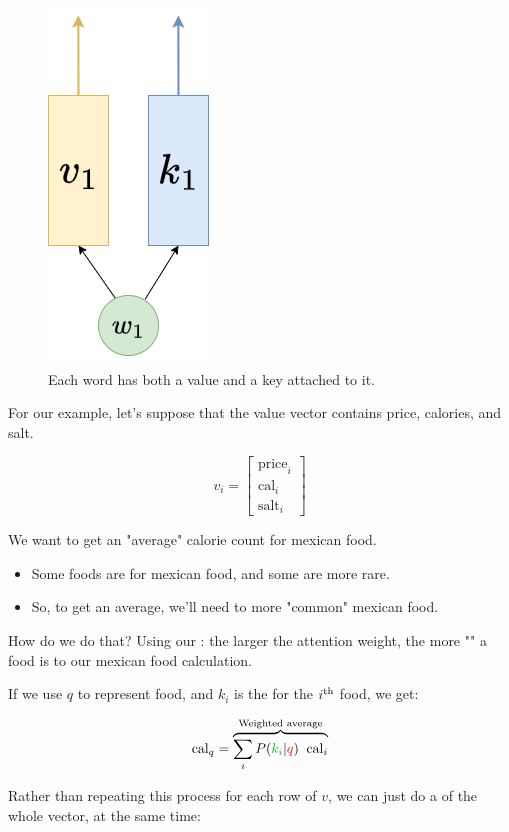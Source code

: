         \begin{figure}[H]
            \centering
            \includegraphics[width=0.1\linewidth]{images/transformers_images/value_key.png}
            \caption*{Each word has both a value and a key attached to it.}
        \end{figure}

        For our example, let's suppose that the value vector contains price, calories, and salt.

        \begin{equation}
            v_i = \begin{bmatrix}
                \text{price}_i \\ \text{cal}_i \\ \text{salt}_i
            \end{bmatrix}
        \end{equation}

        We want to get an "average" calorie count for mexican food.

        \begin{itemize}
            \item Some foods are  for mexican food, and some are more rare.

            \item So, to get an average, we'll need to  more "common" mexican food.
        \end{itemize}

        How do we do that? Using our : the larger the attention weight, the more "" a food is to our mexican food calculation.

        If we use $q$ to represent  food, and $k_i$ is the  for the $i^{ \text{th} }$ food, we get:

        \begin{equation}
            \text{cal}_{q} = 
            \overbrace{
                \sum_i P(\grn{k_i}|\red{q}) \;\; \text{cal}_{i}
            }^{\text{Weighted average}}
        \end{equation}

        Rather than repeating this process for each row of $v$, we can just do a  of the whole vector, at the same time:

